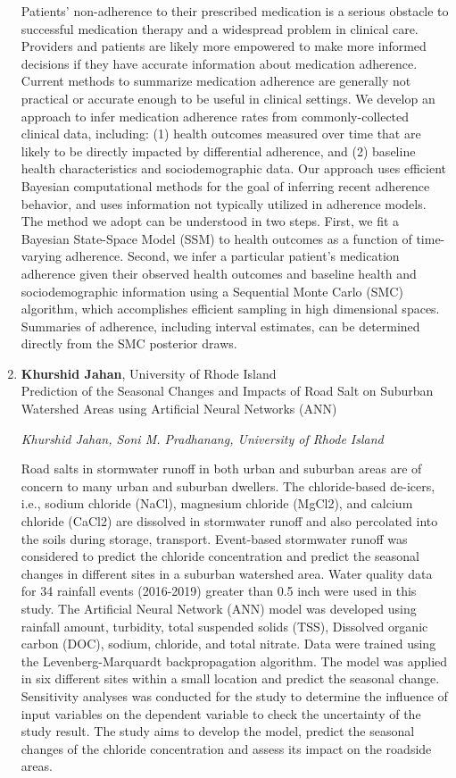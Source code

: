 \begin{enumerate}
Patients' non-adherence to their prescribed medication is a serious obstacle to successful medication therapy and a widespread problem in clinical care. Providers and patients are likely more empowered to make more informed decisions if they have accurate information about medication adherence. Current methods to summarize medication adherence are generally not practical or accurate enough to be useful in clinical settings. We develop an approach to infer medication adherence rates from commonly-collected clinical data, including: (1) health outcomes measured over time that are likely to be directly impacted by differential adherence, and (2) baseline health characteristics and sociodemographic data. Our approach uses efficient Bayesian computational methods for the goal of inferring recent adherence behavior, and uses information not typically utilized in adherence models. The method we adopt can be understood in two steps. First, we fit a Bayesian State-Space Model (SSM) to health outcomes as a function of time-varying adherence. Second, we infer a particular patient's medication adherence given their observed health outcomes and baseline health and sociodemographic information using a Sequential Monte Carlo (SMC) algorithm, which accomplishes efficient sampling in high dimensional spaces. Summaries of adherence, including interval estimates, can be determined directly from the SMC posterior draws.

\item \textbf{Khurshid Jahan}, University of Rhode Island \\
Prediction of the Seasonal Changes and Impacts of Road Salt on Suburban Watershed Areas using Artificial Neural Networks (ANN)

\emph{\footnotesize Khurshid Jahan, Soni M. Pradhanang, University of Rhode Island}

Road salts in stormwater runoff in both urban and suburban areas are of concern to many urban and suburban dwellers. The chloride-based de-icers, i.e., sodium chloride (NaCl), magnesium chloride (MgCl2), and calcium chloride (CaCl2) are dissolved in stormwater runoff and also percolated into the soils during storage, transport. Event-based stormwater runoff was considered to predict the chloride concentration and predict the seasonal changes in different sites in a suburban watershed area. Water quality data for 34 rainfall events (2016-2019) greater than 0.5 inch were used in this study. The Artificial Neural Network (ANN) model was developed using rainfall amount, turbidity, total suspended solids (TSS), Dissolved organic carbon (DOC), sodium, chloride, and total nitrate. Data were trained using the Levenberg-Marquardt backpropagation algorithm. The model was applied in six different sites within a small location and predict the seasonal change. Sensitivity analyses was conducted for the study to determine the influence of input variables on the dependent variable to check the uncertainty of the study result. The study aims to develop the model, predict the seasonal changes of the chloride concentration and assess its impact on the roadside areas.


\end{enumerate}
